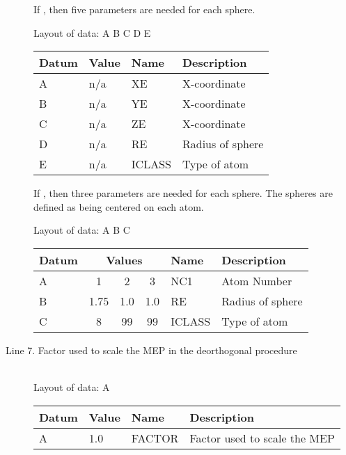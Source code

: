 \begin{description}
If , then five parameters are needed for each sphere.

Layout of data: A B C D E                                                            

\begin{center}
\begin{tabular}{llll}
\hline
 Datum & Value & Name   &  Description \\ \hline
    A  & n/a   & XE     &  X-coordinate \\
    B  & n/a   & YE     &  X-coordinate \\
    C  & n/a   & ZE     &  X-coordinate \\
    D  & n/a   & RE     &  Radius of sphere \\
    E  & n/a   & ICLASS &  Type of atom \\ \hline
\end{tabular}
\end{center}

If , then three parameters are needed for each sphere.  The
spheres are defined as being centered on each atom.

Layout of data: A B C
 
\begin{center}
\begin{tabular}{lcccll} 
\hline 
 Datum & \multicolumn{3}{c}{Values} & Name   &  Description \\ \hline
   A  & 1 & 2 & 3            & NC1    &  Atom Number \\
   B  & 1.75 & 1.0 & 1.0     & RE     &  Radius of sphere \\
   C  & 8 & 99 & 99          &ICLASS  &  Type of atom \\ \hline
\end{tabular}
\end{center}
                                                                      
\item[Line 7. Factor used to scale the MEP in the deorthogonal procedure]~\\
Layout of data:    A 

\begin{center}
\begin{tabular}{llll}  
\hline 
 Datum & Value & Name   &  Description  \\ \hline
    A  & 1.0 & FACTOR  &  Factor used to scale the MEP \\ \hline
\end{tabular} 
\end{center}
\end{description}
